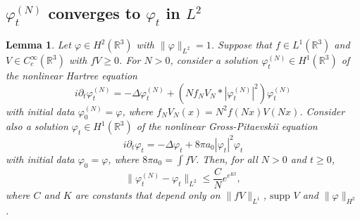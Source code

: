 \documentclass[11pt,a4paper]{scrartcl}
\newtheorem{lem}[thm]{Lemma}
\newcommand{\R}{\mathds{R}}
\begin{document}
\subsection{$\varphi_t^{(N)}$ converges to $\varphi_t$ in $L^2$}


\begin{lem}
  Let $\varphi \in H^2(\R^3)$ with $\| \varphi \|_{L^2} = 1$. Suppose that $f
  \in L^1(\R^3)$ and $V \in C_c^\infty(\R^3)$ with $fV \ge 0$. For $N > 0$,
  consider a solution $\varphi_t^{(N)} \in H^1(\R^3)$ of the nonlinear Hartree
  equation
  \begin{displaymath}
    i \partial_t \varphi_t^{(N)} = - \Delta \varphi_t^{(N)} + (N f_N V_N *
    |\varphi_t^{(N)}|^2) \varphi_t^{(N)}
  \end{displaymath}
  with initial data $\varphi^{(N)}_0 = \varphi$, where $f_N V_N(x) = N^2
  f(Nx)V(Nx)$. Consider also a solution $\varphi_t \in H^1(\R^3)$ of the
  nonlinear Gross-Pitaevskii equation
  \begin{displaymath}
    i \partial_t \varphi_t = - \Delta \varphi_t + 8 \pi a_0 |\varphi_t|^2
    \varphi_t
  \end{displaymath}
  with initial data $\varphi_0 = \varphi$, where $8 \pi a_0 = \int f V$. Then,
  for all $N > 0$ and $t \ge 0$,
  \begin{displaymath}
    \| \varphi_t^{(N)} - \varphi_t \|_{L^2} \le \frac{C}{N} e^{e^{K t}},
  \end{displaymath}
  where $C$ and $K$ are constants that depend only on $\| fV \|_{L^1}$,
  $\text{supp }V$ and $\| \varphi \|_{H^2}$. 
\end{lem}
\end{document}
